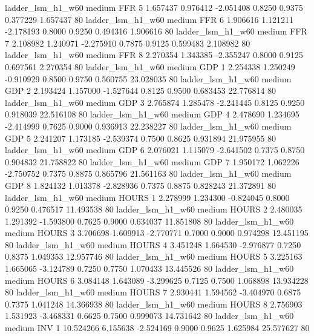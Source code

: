      ladder_lsm_h1_w60     medium      FFR                 5  1.657437 0.976412 -2.051408 0.8250 0.9375  0.377229    1.657437 80
     ladder_lsm_h1_w60     medium      FFR                 6  1.906616 1.121211 -2.178193 0.8000 0.9250  0.494316    1.906616 80
     ladder_lsm_h1_w60     medium      FFR                 7  2.108982 1.240971 -2.275910 0.7875 0.9125  0.599483    2.108982 80
     ladder_lsm_h1_w60     medium      FFR                 8  2.270354 1.343385 -2.355247 0.8000 0.9125  0.697561    2.270354 80
     ladder_lsm_h1_w60     medium      GDP                 1  2.254338 1.250249 -0.910929 0.8500 0.9750  0.560755   23.028035 80
     ladder_lsm_h1_w60     medium      GDP                 2  2.193424 1.157000 -1.527644 0.8125 0.9500  0.683453   22.776814 80
     ladder_lsm_h1_w60     medium      GDP                 3  2.765874 1.285478 -2.241445 0.8125 0.9250  0.918039   22.516108 80
     ladder_lsm_h1_w60     medium      GDP                 4  2.478690 1.234695 -2.414999 0.7625 0.9000  0.936913   22.238227 80
     ladder_lsm_h1_w60     medium      GDP                 5  2.241207 1.173185 -2.539374 0.7500 0.8625  0.931894   21.975955 80
     ladder_lsm_h1_w60     medium      GDP                 6  2.076021 1.115079 -2.641502 0.7375 0.8750  0.904832   21.758822 80
     ladder_lsm_h1_w60     medium      GDP                 7  1.950172 1.062226 -2.750752 0.7375 0.8875  0.865796   21.561163 80
     ladder_lsm_h1_w60     medium      GDP                 8  1.824132 1.013378 -2.828936 0.7375 0.8875  0.828243   21.372891 80
     ladder_lsm_h1_w60     medium    HOURS                 1  2.278999 1.234300 -0.824045 0.8000 0.9250  0.476517   11.493538 80
     ladder_lsm_h1_w60     medium    HOURS                 2  2.480035 1.291392 -1.593800 0.7625 0.9000  0.634037   11.851808 80
     ladder_lsm_h1_w60     medium    HOURS                 3  3.706698 1.609913 -2.770771 0.7000 0.9000  0.974298   12.451195 80
     ladder_lsm_h1_w60     medium    HOURS                 4  3.451248 1.664530 -2.976877 0.7250 0.8375  1.049353   12.957746 80
     ladder_lsm_h1_w60     medium    HOURS                 5  3.225163 1.665065 -3.124789 0.7250 0.7750  1.070433   13.445526 80
     ladder_lsm_h1_w60     medium    HOURS                 6  3.084148 1.643089 -3.299625 0.7125 0.7500  1.068898   13.934228 80
     ladder_lsm_h1_w60     medium    HOURS                 7  2.930441 1.594562 -3.404970 0.6875 0.7375  1.041248   14.366938 80
     ladder_lsm_h1_w60     medium    HOURS                 8  2.756903 1.531923 -3.468331 0.6625 0.7500  0.999073   14.731642 80
     ladder_lsm_h1_w60     medium      INV                 1 10.524266 6.155638 -2.524169 0.9000 0.9625  1.625984   25.577627 80
